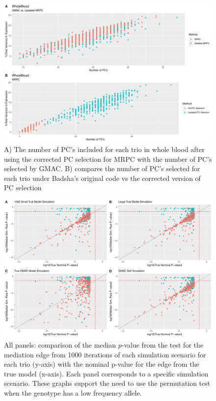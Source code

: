 \documentclass[
]{article}
\begin{document}
\begin{figure}
\centering
\includegraphics{5_17_2021_GMAC_plots_all_trios_files/figure-latex/unnamed-chunk-4-1.pdf}
\caption{A) The number of PC's included for each trio in whole blood
after using the corrected PC selection for MRPC with the number of PC's
selected by GMAC. B) compares the number of PC's selected for each trio
under Badsha's original code vs the corrected version of PC selection}
\end{figure}

\begin{figure}
\centering
\includegraphics{5_17_2021_GMAC_plots_all_trios_files/figure-latex/unnamed-chunk-5-1.pdf}
\caption{All panels: comparison of the median \(p\)-value from the test
for the mediation edge from 1000 iterations of each simulation scenario
for each trio (y-axis) with the nominal p-value for the edge from the
true model (x-axis). Each panel corresponds to a specific simulation
scenario. These graphs support the need to use the permutation test when
the genotype has a low frequency allele.}
\end{figure}
\end{document}
